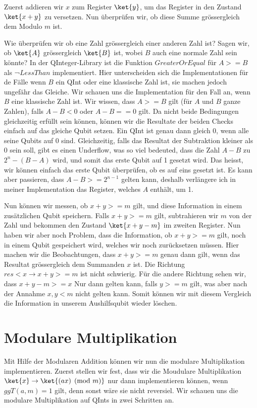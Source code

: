 Zuerst addieren wir $x$ zum Register $\ket{y}$, um das Register in den Zustand $\ket{x + y}$ zu versetzen. Nun überprüfen wir, ob diese Summe grössergleich dem Modulo $m$ ist. 

Wie überprüfen wir ob eine Zahl grössergleich einer anderen Zahl ist? Sagen wir, ob $\ket{A}$ grössergleich $\ket{B}$ ist, wobei $B$ auch eine normale Zahl sein könnte? In der QInteger-Library ist die Funktion $GreaterOrEqual$ für $A >= B$ als ¬$LessThan$ implementiert. Hier unterscheiden sich die Implementationen für de Fälle wenn $B$ ein QInt oder eine klassische Zahl ist, sie machen jedoch ungefähr das Gleiche. Wir schauen uns die Implementation für den Fall an, wenn $B$ eine klassische Zahl ist. Wir wissen, dass $A >= B$ gilt (für $A$ und $B$ ganze Zahlen), falls $A - B < 0$ oder $A - B == 0$ gilt. Da nicht beide Bedingungen gleichzeitig erfüllt sein können, können wir die Resultate der beiden Checks einfach auf das gleiche Qubit setzen. Ein QInt ist genau dann gleich 0, wenn alle seine Qubits auf 0 sind. Gleichzeitig, falls das Resultat der Subtraktion kleiner als $0$ sein soll, gibt es einen Underflow, was so viel bedeuted, dass die Zahl $A - B$ zu $2^n - (B - A)$ wird, und somit das erste Qubit auf 1 gesetzt wird. Das heisst, wir können einfach das erste Qubit überprüfen, ob es auf eins gesetzt ist. Es kann aber passieren, dass $A - B >= 2^{n - 1}$ gelten kann, deshalb verlängere ich in meiner Implementation das Register, welches $A$ enthält, um 1.



Nun können wir messen, ob $x + y >= m$ gilt, und diese Information in einem zusätzlichen Qubit speichern. Falls $x + y >= m$ gilt, subtrahieren wir $m$ von der Zahl und bekommen den Zustand $\ket{x + y - m}$ im zweiten Register. Nun haben wir aber noch Problem, dass die Information, ob $x + y >= m$ gilt, noch in einem Qubit gespeichert wird, welches wir noch zurücksetzen müssen. Hier machen wir die Beobachtungen, dass $x + y >= m$ genau dann gilt, wenn das Resultat grössergleich dem Summanden $x$ ist. Die Richtung $res < x \rightarrow x + y >= m$ ist nicht schwierig. Für die andere Richtung sehen wir, dass $x + y - m >= x$ Nur dann gelten kann, falls $y >= m$ gilt, was aber nach der Annahme $x, y < m$ nicht gelten kann. Somit können wir mit diesem Vergleich die Information in unserem Aushilfsqubit wieder löschen.

\section{Modulare Multiplikation}
Mit Hilfe der Modularen Addition können wir nun die modulare Multiplikation implementieren. Zuerst stellen wir fest, dass wir die Moudulare Multiplikation $\ket{x} \rightarrow \ket{(ax) \pmod{m}}$ nur dann implementieren können, wenn $ggT(a, m) = 1$ gilt, denn sonst wäre sie nicht reversiel. \newline
Wir schauen uns die modulare Multiplikation auf QInts in zwei Schritten an.

